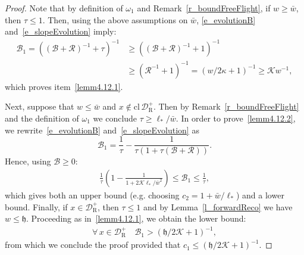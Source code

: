 \documentclass[10pt]{amsart}
\theoremstyle{definition}\newtheorem{defi}[theo]{Definition}\newtheorem{rema}[theo]{Remark}\newtheorem{exam}[theo]{Example}\newtheorem{exem}[theo]{Example}\newtheorem{nota}[theo]{Notation}
\newcommand{\fa}{\forall\,}
\newcommand{\curv}{\kappa}
\newcommand{\cl}[1]{\mathrm{cl}\,#1}
\newcommand{\inv}{^{-1}}
\newcommand{\cB}{\mathcal{B}}
\newcommand{\cK}{\mathcal{K}}
\newcommand{\cpar}{\mathcal{R}}
\newcommand{\pslope}{\mathcal{B}}
\newcommand{\cell}{\mathcal{D}}
\newcommand{\privatel}[1]{#1_*}
\newcommand{\slopeb}{\mathfrak{h}}
\newcommand{\elll}{\privatel{\ell}}
\newcommand{\recoPrivate}{\mathrm{R}}
\newcommand{\backReco}{{\cell^+_{\recoPrivate}}}
\newcommand{\ppPrivate}[2]{#1^{#2}}
\newcommand{\prePrivate}[1]{\ppPrivate{#1}{-}}
\newcommand{\prpslope}{\prePrivate{\pslope}}
\newcommand{\llw}{\stackunder[1.2pt]{$w$}{\rule{.8ex}{.075ex}}}
\newcommand{\law}[1]{\omega_{#1}}
\renewcommand{\prpslope}{\cB}
\renewcommand{\llw}{\law{1}}
\renewcommand{\prpslope}{\cB}
\renewcommand{\prpslope}{\cB}
\let\oldforall\forall
\renewcommand*{\forall}{\mathrel{\oldforall}}
\begin{document}
\begin{proof}
Note that by definition of $\llw$ and Remark~\ref{r_boundFreeFlight}, if $w\geq \bar w$, then $\tau\leq 1$. Then, using the above assumptions on $\bar w$, \eqref{e_evolutionB} and~\eqref{e_slopeEvolution} imply:
\begin{align*}
\prpslope_{1} = \left((\prpslope+\cpar)\inv+\tau\right)\inv &\ge \left((\prpslope+\cpar)\inv+1\right)\inv\\
&\ge (\cpar\inv+1)\inv = \left(w/2\curv+1\right)\inv\ge
\cK w\inv,
\end{align*}
which proves item~\eqref{lemm4.12.1}.

Next, suppose that $w\leq \bar w$ and $x\not\in\cl\backReco$. Then by Remark~\ref{r_boundFreeFlight} and the definition of $\llw$ we conclude $\tau\geq\elll/\bar w$. In order to prove~\eqref{lemm4.12.2}, we rewrite~\eqref{e_evolutionB} and~\eqref{e_slopeEvolution} as
\begin{equation}\label{ElFr}
\prpslope_{1}=\frac{1}{\tau}-\frac{1}{\tau(1+\tau(\prpslope+\cpar))}.
\end{equation}
Hence, using $\prpslope\ge0$:
\begin{align*}
\frac{1}{\tau}\left(1-\frac{1}{1+2\cK\elll/\bar w^{2}}\right)\leq \prpslope_{1}\leq \frac{1}{\tau},
\end{align*}
which gives both an upper bound (e.g. choosing $c_{2} = 1+\bar w/\elll$) and a lower bound. Finally, if $x\in\backReco$, then $\tau\le 1$ and by Lemma~\ref{l_forwardReco} we have $w \le \slopeb$. Proceeding as in~\eqref{lemm4.12.1}, we obtain the lower bound:
\begin{align}\label{eq:backReco-lower-bound-for-B}
\fa x\in\backReco\quad \prpslope_{1} > (\slopeb/2\cK+1)\inv,
\end{align}
from which we conclude the proof provided that $c_1\le (\slopeb/2\cK+1)\inv$.
\end{proof}
\end{document}
